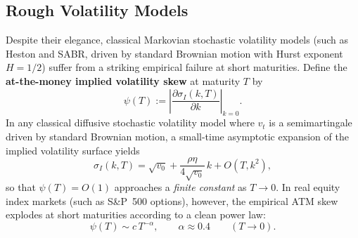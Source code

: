 \subsection{Rough Volatility Models}
\label{sec:ch05-rough-vol}
Despite their elegance, classical Markovian stochastic volatility models (such as Heston and SABR, driven by standard Brownian motion with Hurst exponent $H = 1/2$) suffer from a striking empirical failure at short maturities. Define the \textbf{at-the-money implied volatility skew} at maturity $T$ by
\[
    \psi(T) := \left|\frac{\partial \sigma_I(k, T)}{\partial k}\right|_{k=0}.
\]
In any classical diffusive stochastic volatility model where $v_t$ is a semimartingale driven by standard Brownian motion, a small-time asymptotic expansion of the implied volatility surface yields
\[
    \sigma_I(k, T) = \sqrt{v_0} + \frac{\rho\eta}{4\sqrt{v_0}}\,k + O(T, k^2),
\]
so that $\psi(T) = O(1)$ approaches a \emph{finite constant} as $T \to 0$. In real equity index markets (such as S\&P~500 options), however, the empirical ATM skew explodes at short maturities according to a clean power law:
\[
    \psi(T) \sim c\,T^{-\alpha}, \qquad \alpha \approx 0.4 \qquad (T \to 0).
\]

